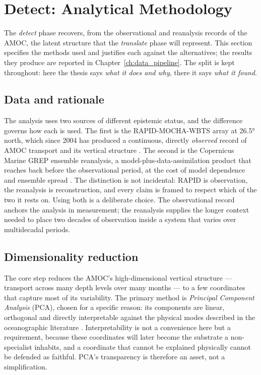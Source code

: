 \section{Detect: Analytical Methodology}
\label{sec:detect-methodology}

The \emph{detect} phase recovers, from the observational and reanalysis records of the AMOC, the latent structure that the \emph{translate} phase will represent. This section specifies the methods used and justifies each against the alternatives; the results they produce are reported in Chapter~\ref{ch:data_pipeline}. The split is kept throughout: here the thesis says \emph{what it does and why}, there it says \emph{what it found}.

\subsection{Data and rationale}
\label{subsec:detect-data}

The analysis uses two sources of different epistemic status, and the difference governs how each is used. The first is the RAPID-MOCHA-WBTS array at \ang{26.5} north, which since 2004 has produced a continuous, directly \emph{observed} record of AMOC transport and its vertical structure \citep{frajkawilliams2021, moat2026}. The second is the Copernicus Marine GREP ensemble reanalysis, a model-plus-data-assimilation product that reaches back before the observational period, at the cost of model dependence and ensemble spread \citep{copernicus_grep}. The distinction is not incidental: RAPID is observation, the reanalysis is reconstruction, and every claim is framed to respect which of the two it rests on. Using both is a deliberate choice. The observational record anchors the analysis in measurement; the reanalysis supplies the longer context needed to place two decades of observation inside a system that varies over multidecadal periods.

\subsection{Dimensionality reduction}
\label{subsec:detect-pca}

The core step reduces the AMOC's high-dimensional vertical structure --- transport across many depth levels over many months --- to a few coordinates that capture most of its variability. The primary method is \emph{Principal Component Analysis} (PCA), chosen for a specific reason: its components are linear, orthogonal and directly interpretable against the physical modes described in the oceanographic literature \citep{hannachi2007, buckley2016}. Interpretability is not a convenience here but a requirement, because these coordinates will later become the substrate a non-specialist inhabits, and a coordinate that cannot be explained physically cannot be defended as faithful. PCA's transparency is therefore an asset, not a simplification.

